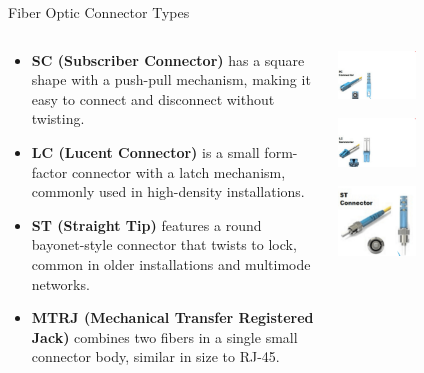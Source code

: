 \documentclass[aspectratio=169]{beamer}
\begin{document}
\begin{frame}{Fiber Optic Connector Types}
    \begin{columns}[T]
        \begin{column}{0.6\textwidth}
            \begin{itemize}
                \item \textbf{SC (Subscriber Connector)} has a square shape with a push-pull mechanism, making it easy to connect and disconnect without twisting.
                \item \textbf{LC (Lucent Connector)} is a small form-factor connector with a latch mechanism, commonly used in high-density installations.
                \item \textbf{ST (Straight Tip)} features a round bayonet-style connector that twists to lock, common in older installations and multimode networks.
                \item \textbf{MTRJ (Mechanical Transfer Registered Jack)} combines two fibers in a single small connector body, similar in size to RJ-45.
            \end{itemize}
        \end{column}
        \begin{column}{0.45\textwidth}
            \centering
            \includegraphics[width=0.45\textwidth]{sc_connect.png}
            
            \vspace{0.3cm}
            \includegraphics[width=0.45\textwidth]{lc_connect.png}
            
            \vspace{0.3cm}
            \includegraphics[width=0.45\textwidth]{st_connect.png}
        \end{column}
    \end{columns}
\end{frame}
\end{document}
